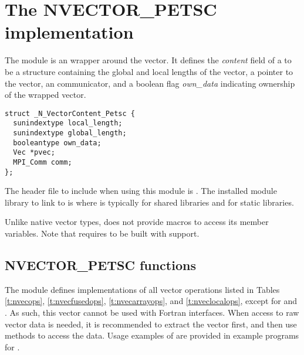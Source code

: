 %
\section{The NVECTOR\_PETSC implementation}\label{ss:nvec_petsc}

The {\nvecpetsc} module is an {\nvector} wrapper around the {\petsc} vector.
It defines the {\em content} field of a  to be a structure containing
the global and local lengths of the vector, a pointer to the {\petsc} vector,
an {\mpi} communicator, and a boolean flag {\em own\_data} indicating ownership of 
the wrapped {\petsc} vector.
\begin{verbatim} 
struct _N_VectorContent_Petsc {
  sunindextype local_length;
  sunindextype global_length;
  booleantype own_data;
  Vec *pvec;
  MPI_Comm comm;
};
\end{verbatim}
The header file to include when using this module is .
The installed module library to link to is
where  is typically  for shared libraries and 
for static libraries.

Unlike native {\sundials} vector types, {\nvecpetsc} does not provide macros 
to access its member variables.
Note that {\nvecpetsc} requires {\sundials} to be built with {\mpi} support.


\subsection{NVECTOR\_PETSC functions}
\label{ss:nvec_petsc_functions}

The {\nvecpetsc} module defines implementations of all vector operations listed 
in Tables \ref{t:nvecops}, \ref{t:nvecfusedops}, \ref{t:nvecarrayops},
and \ref{t:nveclocalops}, except for
 and . As such, this vector cannot be
used with {\sundials} Fortran interfaces.
When access to raw vector data is needed, it is 
recommended to extract the {\petsc} vector first, and then use {\petsc} 
methods to access the data. Usage examples of {\nvecpetsc} are provided in
example programs for {\ida} \cite{ida_ex}.


